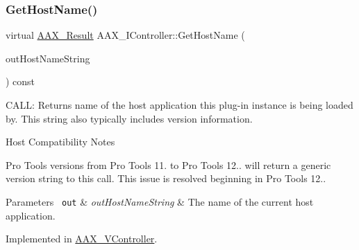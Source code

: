 \mbox{\label{a01789_ad2a002a133491b2ed572054588641e78}} 
\subsubsection{\texorpdfstring{GetHostName()}{GetHostName()}}
{\footnotesize\ttfamily virtual \mbox{\hyperlink{a00392_a4d8f69a697df7f70c3a8e9b8ee130d2f}{A\+A\+X\+\_\+\+Result}} A\+A\+X\+\_\+\+I\+Controller\+::\+Get\+Host\+Name (\begin{DoxyParamCaption}\item[{\mbox{\hyperlink{a01873}{A\+A\+X\+\_\+\+I\+String}} $\ast$}]{out\+Host\+Name\+String }\end{DoxyParamCaption}) const\hspace{0.3cm}{\ttfamily [pure virtual]}}



C\+A\+LL\+: Returns name of the host application this plug-\/in instance is being loaded by. This string also typically includes version information. 

\begin{DoxyRefDesc}{Host Compatibility Notes}
\item[\mbox{\hyperlink{a00786__compatibility_notes000058}{Host Compatibility Notes}}]Pro Tools versions from Pro Tools 11. to Pro Tools 12.. will return a generic version string to this call. This issue is resolved beginning in Pro Tools 12..\end{DoxyRefDesc}



\begin{DoxyParams}[1]{Parameters}
\mbox{\texttt{ out}}  & {\em out\+Host\+Name\+String} & The name of the current host application. \\
\hline
\end{DoxyParams}


Implemented in \mbox{\hyperlink{a01905_a085af48887bdd2eeb8d498b23ad236f9}{A\+A\+X\+\_\+\+V\+Controller}}.

\mbox{\label{a01789_a8326b2acec2d9c9039853adafd9b2bef}} 
